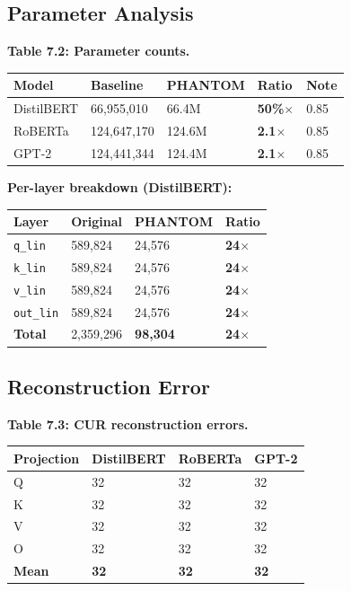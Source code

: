 \subsection{Parameter Analysis}

\textbf{Table 7.2: Parameter counts.}

\begin{table}[H]
\centering
\small
\begin{tabular}{lllll}
\toprule
\textbf{Model} & \textbf{Baseline} & \textbf{PHANTOM} & \textbf{Ratio} & \textbf{Note} \\
\midrule
DistilBERT & 66,955,010 & 66.4M & \textbf{50\%$\times$} & 0.85 \\
RoBERTa & 124,647,170 & 124.6M & \textbf{2.1$\times$} & 0.85 \\
GPT-2 & 124,441,344 & 124.4M & \textbf{2.1$\times$} & 0.85 \\
\bottomrule
\end{tabular}
\end{table}

\textbf{Per-layer breakdown (DistilBERT):}

\begin{table}[H]
\centering
\small
\begin{tabular}{llll}
\toprule
\textbf{Layer} & \textbf{Original} & \textbf{PHANTOM} & \textbf{Ratio} \\
\midrule
\texttt{q\_lin} & 589,824 & 24,576 & \textbf{24$\times$} \\
\texttt{k\_lin} & 589,824 & 24,576 & \textbf{24$\times$} \\
\texttt{v\_lin} & 589,824 & 24,576 & \textbf{24$\times$} \\
\texttt{out\_lin} & 589,824 & 24,576 & \textbf{24$\times$} \\
\textbf{Total} & 2,359,296 & \textbf{98,304} & \textbf{24$\times$} \\
\bottomrule
\end{tabular}
\end{table}

\subsection{Reconstruction Error}

\textbf{Table 7.3: CUR reconstruction errors.}

\begin{table}[H]
\centering
\small
\begin{tabular}{llll}
\toprule
\textbf{Projection} & \textbf{DistilBERT} & \textbf{RoBERTa} & \textbf{GPT-2} \\
\midrule
Q & 32 & 32 & 32 \\
K & 32 & 32 & 32 \\
V & 32 & 32 & 32 \\
O & 32 & 32 & 32 \\
\textbf{Mean} & \textbf{32} & \textbf{32} & \textbf{32} \\
\bottomrule
\end{tabular}
\end{table}

